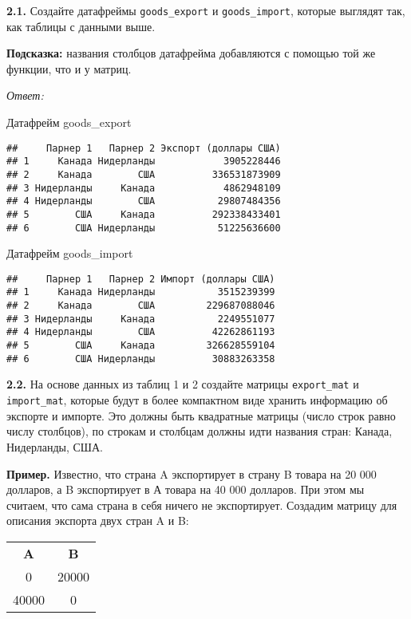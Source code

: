 \documentclass[
]{article}
\begin{document}
\textbf{2.1.} Создайте датафреймы \texttt{goods\_export} и
\texttt{goods\_import}, которые выглядят так, как таблицы с данными
выше.

\textbf{Подсказка:} названия столбцов датафрейма добавляются с помощью
той же функции, что и у матриц.

\emph{Ответ:}

Датафрейм goods\_export

\begin{verbatim}
##     Парнер 1   Парнер 2 Экспорт (доллары США)
## 1     Канада Нидерланды            3905228446
## 2     Канада        США          336531873909
## 3 Нидерланды     Канада            4862948109
## 4 Нидерланды        США           29807484356
## 5        США     Канада          292338433401
## 6        США Нидерланды           51225636600
\end{verbatim}

Датафрейм goods\_import

\begin{verbatim}
##     Парнер 1   Парнер 2 Импорт (доллары США)
## 1     Канада Нидерланды           3515239399
## 2     Канада        США         229687088046
## 3 Нидерланды     Канада           2249551077
## 4 Нидерланды        США          42262861193
## 5        США     Канада         326628559104
## 6        США Нидерланды          30883263358
\end{verbatim}

\textbf{2.2.} На основе данных из таблиц 1 и 2 создайте матрицы
\texttt{export\_mat} и \texttt{import\_mat}, которые будут в более
компактном виде хранить информацию об экспорте и импорте. Это должны
быть квадратные матрицы (число строк равно числу столбцов), по строкам и
столбцам должны идти названия стран: Канада, Нидерланды, США.

\textbf{Пример.} Известно, что страна A экспортирует в страну B товара
на 20 000 долларов, а B экспортирует в А товара на 40 000 долларов. При
этом мы считаем, что сама страна в себя ничего не экспортирует. Создадим
матрицу для описания экспорта двух стран A и B:

\begin{table}[ht!]
\centering
\begin{tabular}{cc}
\textbf{A} & \textbf{B} \\
0 & 20000 \\
40000 & 0 \\
\end{tabular}
\end{table}
\end{document}
